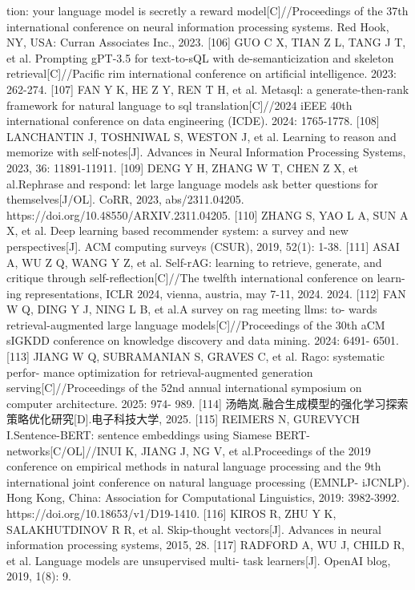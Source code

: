 \documentclass[12pt,a4paper,openright,UTF8]{ctexbook}
\begin{document}
tion: your language model is secretly a reward model[C]//Proceedings of the 37th
international conference on neural information processing systems. Red Hook, NY,
USA: Curran Associates Inc., 2023.
[106] GUO C X, TIAN Z L, TANG J T, et al. Prompting gPT-3.5 for text-to-sQL with
de-semanticization and skeleton retrieval[C]//Pacific rim international conference
on artificial intelligence. 2023: 262-274.
[107] FAN Y K, HE Z Y, REN T H, et al. Metasql: a generate-then-rank framework for
natural language to sql translation[C]//2024 iEEE 40th international conference on
data engineering (ICDE). 2024: 1765-1778.
[108] LANCHANTIN J, TOSHNIWAL S, WESTON J, et al. Learning to reason and
memorize with self-notes[J]. Advances in Neural Information Processing Systems,
2023, 36: 11891-11911.
[109] DENG Y H, ZHANG W T, CHEN Z X, et al.Rephrase and respond: let
large language models ask better questions for themselves[J/OL]. CoRR, 2023,
abs/2311.04205. https://doi.org/10.48550/ARXIV.2311.04205.
[110] ZHANG S, YAO L A, SUN A X, et al. Deep learning based recommender system:
a survey and new perspectives[J]. ACM computing surveys (CSUR), 2019, 52(1):
1-38.
[111] ASAI A, WU Z Q, WANG Y Z, et al. Self-rAG: learning to retrieve, generate, and
critique through self-reflection[C]//The twelfth international conference on learn-
ing representations, ICLR 2024, vienna, austria, may 7-11, 2024. 2024.
[112] FAN W Q, DING Y J, NING L B, et al.A survey on rag meeting llms: to-
wards retrieval-augmented large language models[C]//Proceedings of the 30th
aCM sIGKDD conference on knowledge discovery and data mining. 2024: 6491-
6501.
[113] JIANG W Q, SUBRAMANIAN S, GRAVES C, et al. Rago: systematic perfor-
mance optimization for retrieval-augmented generation serving[C]//Proceedings of
the 52nd annual international symposium on computer architecture. 2025: 974-
989.
[114] 汤皓岚.融合生成模型的强化学习探索策略优化研究[D].电子科技大学,
2025.
[115] REIMERS N, GUREVYCH I.Sentence-BERT: sentence embeddings using
Siamese BERT-networks[C/OL]//INUI K, JIANG J, NG V, et al.Proceedings
of the 2019 conference on empirical methods in natural language processing and
the 9th international joint conference on natural language processing (EMNLP-
iJCNLP). Hong Kong, China: Association for Computational Linguistics, 2019:
3982-3992. https://doi.org/10.18653/v1/D19-1410.
[116] KIROS R, ZHU Y K, SALAKHUTDINOV R R, et al. Skip-thought vectors[J].
Advances in neural information processing systems, 2015, 28.
[117] RADFORD A, WU J, CHILD R, et al. Language models are unsupervised multi-
task learners[J]. OpenAI blog, 2019, 1(8): 9.
\end{document}
